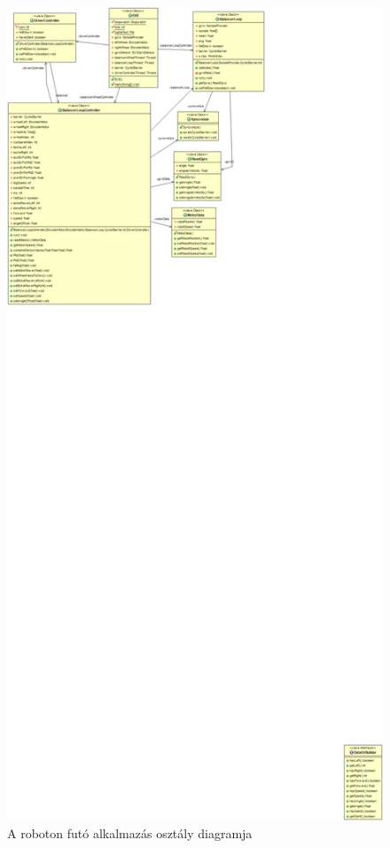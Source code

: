 \pagebreak
\begin{figure}[h]
	\centering
	\includegraphics[width=1\textwidth]{images/gyroBoyUML.png}
	\caption{A roboton futó alkalmazás osztály diagramja}
	\label{fig:gyroBoyUML}
\end{figure}
\pagebreak

